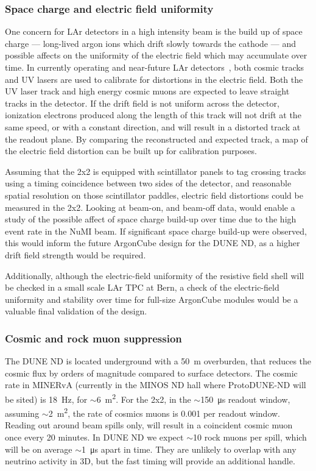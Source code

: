 \subsubsection{Space charge and electric field uniformity}
\label{sec:efield}
One concern for LAr detectors in a high intensity beam is the build up of space charge --- long-lived argon ions which drift slowly towards the cathode --- and possible affects on the uniformity of the electric field which may accumulate over time. In currently operating and near-future LAr detectors~\cite{Ereditato:2014lra, Antonello:2015lea}, both cosmic tracks and UV lasers are used to calibrate for distortions in the electric field. Both the UV laser track and high energy cosmic muons are expected to leave straight tracks in the detector. If the drift field is not uniform across the detector, ionization electrons produced along the length of this track will not drift at the same speed, or with a constant direction, and will result in a distorted track at the readout plane. By comparing the reconstructed and expected track, a map of the electric field distortion can be built up for calibration purposes.

Assuming that the 2x2 is equipped with scintillator panels to tag crossing tracks using a timing coincidence between two sides of the detector, and reasonable spatial resolution on those scintillator paddles, electric field distortions could be measured in the 2x2. Looking at beam-on, and beam-off data, would enable a study of the possible affect of space charge build-up over time due to the high event rate in the NuMI beam. If significant space charge build-up were observed, this would inform the future ArgonCube design for the DUNE ND, as a higher drift field strength would be required.

Additionally, although the electric-field uniformity of the resistive field shell will be checked in a small scale LAr TPC at Bern, a check of the electric-field uniformity and stability over time for full-size ArgonCube modules would be a valuable final validation of the design.

\subsubsection{Cosmic and rock muon suppression}
\label{sec:cosmic-suppression}

The DUNE ND is located underground with a \SI{50}{\metre} overburden, that reduces the cosmic flux by orders of magnitude compared to surface detectors. The cosmic rate in MINERvA (currently in the MINOS ND hall where ProtoDUNE-ND will be sited) is \SI{18}{\hertz}, for $\sim$\SI{6}{\metre\squared}. For the 2x2, in the $\sim$\SI{150}{\micro\second} readout window, assuming $\sim$\SI{2}{\metre\squared}, the rate of cosmics muons is 0.001 per readout window. Reading out around beam spills only, will result in a coincident cosmic muon once every 20 minutes.
In DUNE ND we expect $\sim$10 rock muons per spill, which will be on average $\sim$\SI{1}{\micro\second} apart in time. They are unlikely to overlap with any neutrino activity in 3D, but the fast timing will provide an additional handle.

